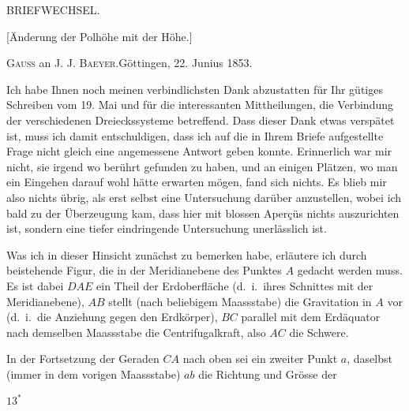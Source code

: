 \clearpage
\begin{center}
{\Large BRIEFWECHSEL.}\par\vspace{10mm}
{\large [Änderung der Polhöhe mit der Höhe.]}\par\vspace{8mm}
\textsc{Gauss} an \textsc{J. J. Baeyer}.\quad Göttingen, 22. Junius 1853.
\end{center}
Ich habe Ihnen noch meinen verbindlichsten Dank abzustatten für Ihr gütiges Schreiben vom 19. Mai und für die interessanten Mittheilungen, die Verbindung der verschiedenen Dreieckssysteme betreffend. Dass dieser Dank etwas verspätet ist, muss ich damit entschuldigen, dass ich auf die in Ihrem Briefe aufgestellte Frage nicht gleich eine angemessene Antwort geben konnte. Erinnerlich war mir nicht, sie irgend wo berührt gefunden zu haben, und an einigen Plätzen, wo man ein Eingehen darauf wohl hätte erwarten mögen, fand sich nichts. Es blieb mir also nichts übrig, als erst selbst eine Untersuchung darüber anzustellen, wobei ich bald zu der Überzeugung kam, dass hier mit blossen Aperçüs nichts auszurichten ist, sondern eine tiefer eindringende Untersuchung unerlässlich ist.

Was ich in dieser Hinsicht zunächst zu bemerken habe, erläutere ich durch beistehende Figur, die in der Meridianebene des Punktes $A$ gedacht werden muss. Es ist dabei $DAE$ ein Theil der Erdoberfläche (d.\ i.\ ihres Schnittes mit der Meridianebene), $AB$ stellt (nach beliebigem Maassstabe) die Gravitation in $A$ vor (d.\ i.\ die Anziehung gegen den Erdkörper), $BC$ parallel mit dem Erdäquator nach demselben Maassstabe die Centrifugalkraft, also $AC$ die Schwere.

In der Fortsetzung der Geraden $CA$ nach oben sei ein zweiter Punkt $a$, daselbst (immer in dem vorigen Maassstabe) $ab$ die Richtung und Grösse der
\par\noindent\hfill $13^{*}$\par

